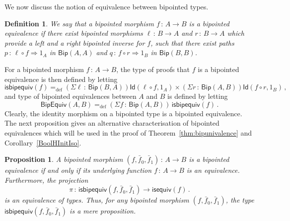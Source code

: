 \documentclass[10pt,a4paper,oneside,reqno]{amsart}
\theoremstyle{mythm}
\newtheorem{proposition}[theorem]{Proposition}
\theoremstyle{mydef}
\newtheorem{definition}[theorem]{Definition}
\theoremstyle{myrmk}
\newcommand{\ie}{\text{i.e.\ }}
\newcommand{\myemph}[1]{\textit{#1}}
\newcommand{\defeq}{=_{\mathrm{def}}}
\newcommand{\co}{\,{:}\,}
\newcommand{\isequiv}{\mathsf{isequiv}}
\newcommand{\Id}{\mathsf{Id}}
\newcommand{\Bip}{\mathsf{Bip}}
\newcommand{\BipHom}{\mathsf{Bip}}
\newcommand{\isbipequiv}{\mathsf{isbipequiv}}
\newcommand{\BipEquiv}{\mathsf{BipEquiv}}
\begin{document}
\medskip

We now discuss the notion of equivalence between bipointed types.



\begin{definition} We say that a bipointed morphism $f \co A \to B$ is a \myemph{bipointed equivalence}
if there exist bipointed morphisms $\ell \co B \to A$ and $r \co B \to A$ which provide a left and a right bipointed inverse for $f$, \ie such that there exist paths $p \co \ell \circ f \Rightarrow 1_A$ in $\Bip(A,A)$ and $q \co f \circ r \Rightarrow 1_B$
in $\Bip(B,B)$.
\end{definition}

For a bipointed morphism $f \co A \to B$, the type of proofs that $f$ is a bipointed equivalence is
then defined by letting
\[
\isbipequiv(f) \defeq   (\Sigma \ell \co \BipHom(B,A)) \Id( \ell \circ f, 1_A ) \times 
    (\Sigma r \co \BipHom(A, B)) \Id (f \circ r , 1_B ) \, ,
\]
and type of bipointed equivalences between $A$ and $B$ is defined by letting
\[
\BipEquiv(A, B)
\defeq    
(\Sigma f \co \BipHom(A,B)) \, \isbipequiv(f)  \, . 
\] 
Clearly, the identity morphism on a bipointed type is a bipointed equivalence. The next proposition
gives an alternative characterisation of bipointed equivalences which will be used
 in the proof of Theorem~\ref{thm:bipunivalence} and Corollary~\ref{BoolHInitIso}.

\begin{proposition}  \label{thm:usemere}
A bipointed morphism $(f, \bar{f}_0, \bar{f}_1) \co A \to B$ is a bipointed equivalence if and only
if its underlying function $f \co A \to B$ is an equivalence. Furthermore, the projection
\[
\pi \co \isbipequiv(f, \bar{f}_0, \bar{f}_1)  \to \isequiv(f) \, .
\]
is an equivalence of types. Thus, for any bipointed morphism $(f, \bar{f}_0, \bar{f}_1)$, the type $\isbipequiv(f, \bar{f}_0, \bar{f}_1)$ is a mere proposition.
\end{proposition}  
\end{document}

